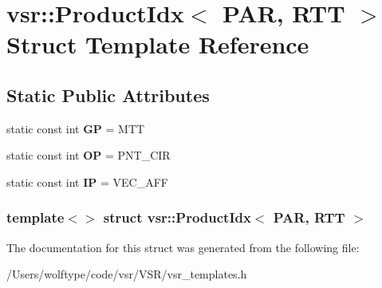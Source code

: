 \hypertarget{structvsr_1_1_product_idx_3_01_p_a_r_00_01_r_t_t_01_4}{\section{vsr\-:\-:Product\-Idx$<$ P\-A\-R, R\-T\-T $>$ Struct Template Reference}
\label{structvsr_1_1_product_idx_3_01_p_a_r_00_01_r_t_t_01_4}
}
\subsection*{Static Public Attributes}
\begin{DoxyCompactItemize}
\item 
\hypertarget{structvsr_1_1_product_idx_3_01_p_a_r_00_01_r_t_t_01_4_a15ac183c2159092a23484522b4e9c7b8}{static const int {\bfseries G\-P} = M\-T\-T}\label{structvsr_1_1_product_idx_3_01_p_a_r_00_01_r_t_t_01_4_a15ac183c2159092a23484522b4e9c7b8}

\item 
\hypertarget{structvsr_1_1_product_idx_3_01_p_a_r_00_01_r_t_t_01_4_a70cc0543e7972440a3d5355c2ea2d1bd}{static const int {\bfseries O\-P} = P\-N\-T\-\_\-\-C\-I\-R}\label{structvsr_1_1_product_idx_3_01_p_a_r_00_01_r_t_t_01_4_a70cc0543e7972440a3d5355c2ea2d1bd}

\item 
\hypertarget{structvsr_1_1_product_idx_3_01_p_a_r_00_01_r_t_t_01_4_a4774270b085725fb55e1169a82b2ad12}{static const int {\bfseries I\-P} = V\-E\-C\-\_\-\-A\-F\-F}\label{structvsr_1_1_product_idx_3_01_p_a_r_00_01_r_t_t_01_4_a4774270b085725fb55e1169a82b2ad12}

\end{DoxyCompactItemize}
\subsubsection*{template$<$$>$ struct vsr\-::\-Product\-Idx$<$ P\-A\-R, R\-T\-T $>$}



The documentation for this struct was generated from the following file\-:\begin{DoxyCompactItemize}
\item 
/\-Users/wolftype/code/vsr/\-V\-S\-R/vsr\-\_\-templates.\-h\end{DoxyCompactItemize}
